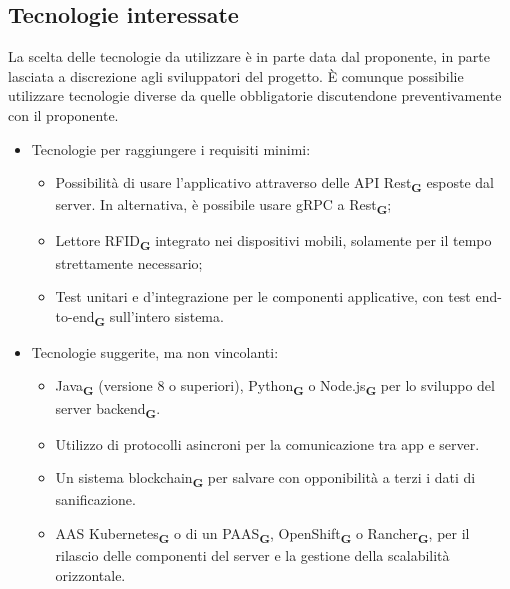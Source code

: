 \subsection{Tecnologie interessate}
La scelta delle tecnologie da utilizzare è in parte data dal proponente, in parte lasciata a discrezione agli sviluppatori del progetto.
È comunque possibilie utilizzare tecnologie diverse da quelle obbligatorie discutendone preventivamente con il proponente.
\begin{itemize}
    \item Tecnologie per raggiungere i requisiti minimi:
          \begin{itemize}
              \item Possibilità di usare l'applicativo attraverso delle API Rest\textsubscript{\textbf{G}} esposte dal server. In alternativa, è possibile usare gRPC a Rest\textsubscript{\textbf{G}};
              \item Lettore RFID\textsubscript{\textbf{G}} integrato nei dispositivi mobili, solamente per il tempo strettamente necessario;
              \item Test unitari e d'integrazione per le componenti applicative, con test end-to-end\textsubscript{\textbf{G}} sull'intero sistema.
          \end{itemize}
    \item Tecnologie suggerite, ma non vincolanti:
          \begin{itemize}
              \item Java\textsubscript{\textbf{G}} (versione 8 o superiori), Python\textsubscript{\textbf{G}} o Node.js\textsubscript{\textbf{G}} per lo sviluppo del server backend\textsubscript{\textbf{G}}.
              \item Utilizzo di protocolli asincroni per la comunicazione tra app e server.
              \item Un sistema blockchain\textsubscript{\textbf{G}} per salvare con opponibilità a terzi i dati di sanificazione.
              \item AAS Kubernetes\textsubscript{\textbf{G}} o di un PAAS\textsubscript{\textbf{G}}, OpenShift\textsubscript{\textbf{G}} o Rancher\textsubscript{\textbf{G}}, per il rilascio delle componenti del server e la gestione della scalabilità orizzontale.
          \end{itemize}
\end{itemize}

